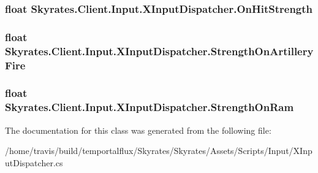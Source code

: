 \hypertarget{class_skyrates_1_1_client_1_1_input_1_1_x_input_dispatcher_a5f7cd1e18bea1cbd99c5df7dd27d4804}{
\subsubsection[{On\-Hit\-Strength}]{\setlength{\rightskip}{0pt plus 5cm}float Skyrates.\-Client.\-Input.\-X\-Input\-Dispatcher.\-On\-Hit\-Strength}}\label{class_skyrates_1_1_client_1_1_input_1_1_x_input_dispatcher_a5f7cd1e18bea1cbd99c5df7dd27d4804}




\hypertarget{class_skyrates_1_1_client_1_1_input_1_1_x_input_dispatcher_af0d461624b8a89d22a04c2221cd1415c}{
\subsubsection[{Strength\-On\-Artillery\-Fire}]{\setlength{\rightskip}{0pt plus 5cm}float Skyrates.\-Client.\-Input.\-X\-Input\-Dispatcher.\-Strength\-On\-Artillery\-Fire}}\label{class_skyrates_1_1_client_1_1_input_1_1_x_input_dispatcher_af0d461624b8a89d22a04c2221cd1415c}




\hypertarget{class_skyrates_1_1_client_1_1_input_1_1_x_input_dispatcher_ab6486f41a0043a925a0ca981d82c9594}{
\subsubsection[{Strength\-On\-Ram}]{\setlength{\rightskip}{0pt plus 5cm}float Skyrates.\-Client.\-Input.\-X\-Input\-Dispatcher.\-Strength\-On\-Ram}}\label{class_skyrates_1_1_client_1_1_input_1_1_x_input_dispatcher_ab6486f41a0043a925a0ca981d82c9594}






The documentation for this class was generated from the following file\-:\begin{DoxyCompactItemize}
\item 
/home/travis/build/temportalflux/\-Skyrates/\-Skyrates/\-Assets/\-Scripts/\-Input/X\-Input\-Dispatcher.\-cs\end{DoxyCompactItemize}
